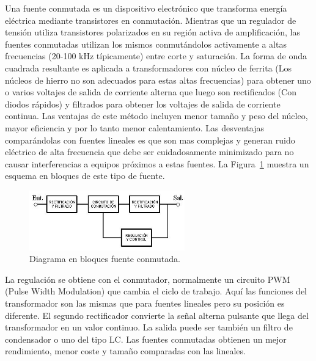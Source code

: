Una fuente conmutada es un dispositivo electrónico que transforma energía eléctrica mediante transistores en conmutación. Mientras que un regulador de tensión utiliza transistores polarizados en su región activa de amplificación, las fuentes conmutadas utilizan los mismos conmutándolos activamente a altas frecuencias (20-100 kHz típicamente) entre corte y saturación. La forma de onda cuadrada resultante es aplicada a transformadores con núcleo de ferrita (Los núcleos de hierro no son adecuados para estas altas frecuencias) para obtener uno o varios voltajes de salida de corriente alterna que luego son rectificados (Con diodos rápidos) y filtrados para obtener los voltajes de salida de corriente continua. Las ventajas de este método incluyen menor tamaño y peso del núcleo, mayor eficiencia y por lo tanto menor calentamiento. Las desventajas comparándolas con fuentes lineales es que son mas complejas y generan ruido eléctrico de alta frecuencia que debe ser cuidadosamente minimizado para no causar interferencias a equipos próximos a estas fuentes. La Figura~\ref{fuente_conmutada_esquema_bloq} muestra un esquema en bloques de este tipo de fuente.

\begin{figure}[H]
\centering
\includegraphics[width=0.6\textwidth]{img/fuente_conmutada_esquema.jpg}
\caption{Diagrama en bloques fuente conmutada.}
\label{fuente_conmutada_esquema_bloq} 
\end{figure}


La regulación se obtiene con el conmutador, normalmente un circuito PWM (Pulse Width Modulation) que cambia el ciclo de trabajo. Aquí las funciones del transformador son las mismas que para fuentes lineales pero su posición es diferente. El segundo rectificador convierte la señal alterna pulsante que llega del transformador en un valor continuo. La salida puede ser también un filtro de condensador o uno del tipo LC. Las fuentes conmutadas obtienen un mejor rendimiento, menor coste y tamaño comparadas con las lineales.

%	
